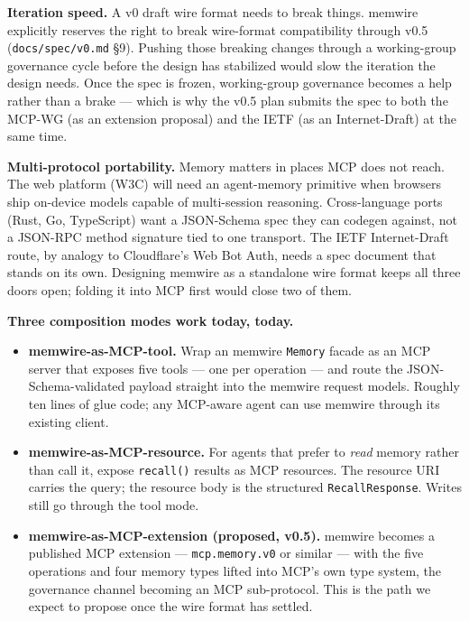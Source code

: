 \documentclass[11pt,letterpaper,twocolumn]{article}
\begin{document}
\textbf{Iteration speed.} A v0 draft wire format needs to break things. memwire explicitly reserves the right to break wire-format compatibility through v0.5 (\texttt{docs/spec/v0.md} \S9). Pushing those breaking changes through a working-group governance cycle before the design has stabilized would slow the iteration the design needs. Once the spec is frozen, working-group governance becomes a help rather than a brake --- which is why the v0.5 plan submits the spec to both the MCP-WG (as an extension proposal) and the IETF (as an Internet-Draft) at the same time.

\textbf{Multi-protocol portability.} Memory matters in places MCP does not reach. The web platform (W3C) will need an agent-memory primitive when browsers ship on-device models capable of multi-session reasoning. Cross-language ports (Rust, Go, TypeScript) want a JSON-Schema spec they can codegen against, not a JSON-RPC method signature tied to one transport. The IETF Internet-Draft route, by analogy to Cloudflare's Web Bot Auth, needs a spec document that stands on its own. Designing memwire as a standalone wire format keeps all three doors open; folding it into MCP first would close two of them.

\textbf{Three composition modes work today, today.}

\begin{itemize}[leftmargin=*]
  \item \textbf{memwire-as-MCP-tool.} Wrap an memwire \texttt{Memory} facade as an MCP server that exposes five tools --- one per operation --- and route the JSON-Schema-validated payload straight into the memwire request models. Roughly ten lines of glue code; any MCP-aware agent can use memwire through its existing client.
  \item \textbf{memwire-as-MCP-resource.} For agents that prefer to \emph{read} memory rather than call it, expose \texttt{recall()} results as MCP resources. The resource URI carries the query; the resource body is the structured \texttt{RecallResponse}. Writes still go through the tool mode.
  \item \textbf{memwire-as-MCP-extension (proposed, v0.5).} memwire becomes a published MCP extension --- \texttt{mcp.memory.v0} or similar --- with the five operations and four memory types lifted into MCP's own type system, the governance channel becoming an MCP sub-protocol. This is the path we expect to propose once the wire format has settled.
\end{itemize}
\end{document}
